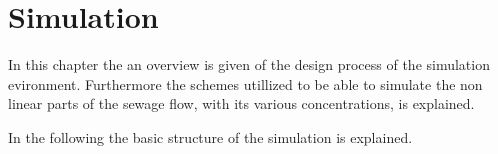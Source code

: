 \chapter{Simulation}\label{ch:simulation}
In this chapter the an overview is given of the design process of the simulation evironment. Furthermore the schemes utillized to be able to simulate the non linear parts of the sewage flow, with its various concentrations, is explained.

In the following the basic structure of the simulation is explained.